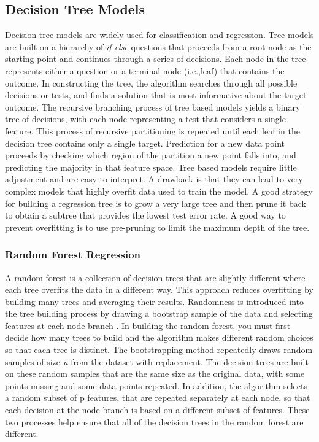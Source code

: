 \documentclass[sigconf]{acmart}
\begin{document}

\subsection{Decision Tree Models}

Decision tree models are widely used for classification and regression. Tree 
models are built on a hierarchy of \textit{if-else} questions that proceeds 
from a root node as the starting point and continues through a series of 
decisions. Each node in the tree represents either a question or a terminal 
node (i.e.,leaf) that contains the outcome. In constructing the tree, the 
algorithm searches through all possible decisions or tests, and finds a 
solution that is most informative about the target outcome. The recursive 
branching process of tree based models yields a binary tree of decisions, 
with each node representing a test that considers a single feature. This 
process of recursive partitioning is repeated until each leaf in the decision 
tree contains only a single target. Prediction for a new data point proceeds 
by checking which region of the partition a new point falls into, and 
predicting the majority in that feature space. Tree based models require 
little adjustment and are easy to interpret. A drawback is that they can lead 
to very complex models that highly overfit data used to train the model. A 
good strategy for building a regression tree is to grow a very large tree 
and then prune it back to obtain a subtree that provides the lowest test error 
rate. A good way to prevent overfitting is to use pre-pruning to limit 
the maximum depth of the tree. 

\subsubsection{Random Forest Regression}

A random forest is a collection of decision trees that are slightly different 
where each tree overfits the data in a different way. This approach reduces 
overfitting by building many trees and averaging their results. Randomness is 
introduced into the tree building process by drawing a bootstrap sample of the 
data and selecting features at each node branch \cite{muller17, raschka17}. 
In building the random forest, you must first decide how many trees to build  
and the algorithm makes different random choices so that each tree is distinct. 
The bootstrapping method repeatedly draws random samples of size \textit{n} 
from the dataset with replacement. The decision trees are built on these 
random samples that are the same size as the original data, with some points 
missing and some data points repeated. In addition, the algorithm selects a 
random subset of p features, that are repeated separately at each node, so 
that each decision at the node branch is based on a different subset of 
features. These two processes help ensure that all of the decision trees in 
the random forest are different. 
\end{document}
